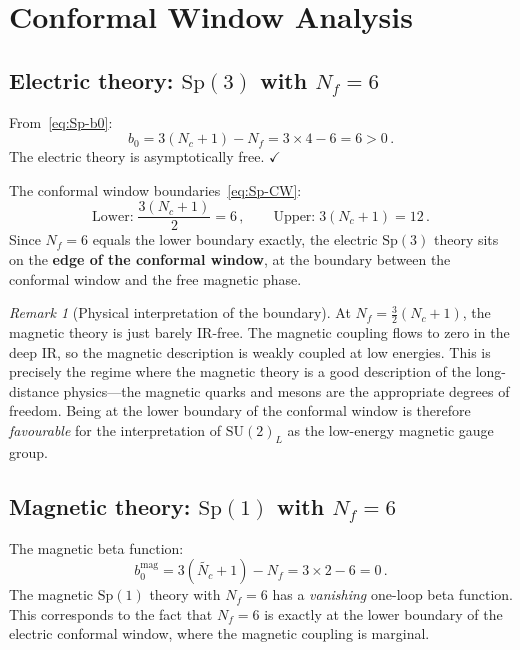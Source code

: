 \documentclass[11pt,a4paper]{article}
\theoremstyle{plain}
\theoremstyle{definition}
\theoremstyle{remark}
\newtheorem{remark}[theorem]{Remark}
\newcommand{\Nc}{N_{\!c}}
\newcommand{\Nf}{N_{\!f}}
\newcommand{\SU}[1]{\mathrm{SU}(#1)}
\newcommand{\Sp}[1]{\mathrm{Sp}(#1)}
\begin{document}
\section{Conformal Window Analysis}
\label{sec:conformal}

\subsection{Electric theory: $\Sp{3}$ with $\Nf = 6$}

From~\eqref{eq:Sp-b0}:
\begin{equation}\label{eq:b0-Sp3}
  b_0 = 3(\Nc + 1) - \Nf = 3 \times 4 - 6 = 6 > 0\,.
\end{equation}
The electric theory is asymptotically free.  $\checkmark$

The conformal window boundaries~\eqref{eq:Sp-CW}:
\begin{equation}\label{eq:CW-Sp3}
  \text{Lower:}\; \frac{3(\Nc + 1)}{2} = 6\,,
  \qquad
  \text{Upper:}\; 3(\Nc + 1) = 12\,.
\end{equation}
Since $\Nf = 6$ equals the lower boundary exactly, the electric
$\Sp{3}$ theory sits on the \textbf{edge of the conformal window}, at
the boundary between the conformal window and the free magnetic
phase.

\begin{remark}[Physical interpretation of the boundary]
At $\Nf = \frac{3}{2}(\Nc + 1)$, the magnetic theory is just barely
IR-free.  The magnetic coupling flows to zero in the deep IR, so the
magnetic description is weakly coupled at low energies.  This is
precisely the regime where the magnetic theory is a good description
of the long-distance physics---the magnetic quarks and mesons are the
appropriate degrees of freedom.  Being at the lower boundary of the
conformal window is therefore \emph{favourable} for the interpretation
of $\SU{2}_L$ as the low-energy magnetic gauge group.
\end{remark}

\subsection{Magnetic theory: $\Sp{1}$ with $\Nf = 6$}

The magnetic beta function:
\begin{equation}\label{eq:b0-mag}
  b_0^{\mathrm{mag}} = 3(\widetilde{\Nc} + 1) - \Nf
  = 3 \times 2 - 6 = 0\,.
\end{equation}
The magnetic $\Sp{1}$ theory with $\Nf = 6$ has a \emph{vanishing}
one-loop beta function.  This corresponds to the fact that $\Nf = 6$
is exactly at the lower boundary of the electric conformal window,
where the magnetic coupling is marginal.
\end{document}
